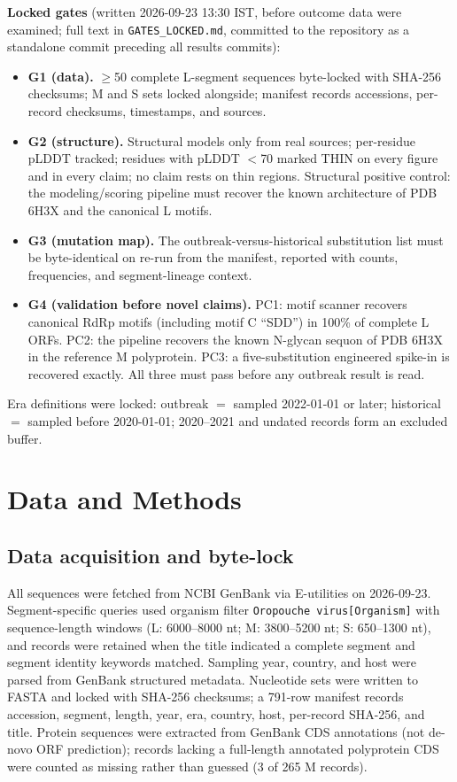 \documentclass[12pt]{article}
\begin{document}
\textbf{Locked gates} (written 2026-09-23 13:30 IST, before outcome data were examined; full text in \texttt{GATES\_LOCKED.md}, committed to the repository as a standalone commit preceding all results commits):
\begin{itemize}
\item \textbf{G1 (data).} $\geq$50 complete L-segment sequences byte-locked with SHA-256 checksums; M and S sets locked alongside; manifest records accessions, per-record checksums, timestamps, and sources.
\item \textbf{G2 (structure).} Structural models only from real sources; per-residue pLDDT tracked; residues with pLDDT $<$70 marked THIN on every figure and in every claim; no claim rests on thin regions. Structural positive control: the modeling/scoring pipeline must recover the known architecture of PDB 6H3X and the canonical L motifs.
\item \textbf{G3 (mutation map).} The outbreak-versus-historical substitution list must be byte-identical on re-run from the manifest, reported with counts, frequencies, and segment-lineage context.
\item \textbf{G4 (validation before novel claims).} PC1: motif scanner recovers canonical RdRp motifs (including motif C ``SDD'') in 100\% of complete L ORFs. PC2: the pipeline recovers the known N-glycan sequon of PDB 6H3X in the reference M polyprotein. PC3: a five-substitution engineered spike-in is recovered exactly. All three must pass before any outbreak result is read.
\end{itemize}
Era definitions were locked: outbreak $=$ sampled 2022-01-01 or later; historical $=$ sampled before 2020-01-01; 2020--2021 and undated records form an excluded buffer.

\section{Data and Methods}
\subsection{Data acquisition and byte-lock}
All sequences were fetched from NCBI GenBank via E-utilities on 2026-09-23. Segment-specific queries used organism filter \texttt{Oropouche virus[Organism]} with sequence-length windows (L: 6000--8000 nt; M: 3800--5200 nt; S: 650--1300 nt), and records were retained when the title indicated a complete segment and segment identity keywords matched. Sampling year, country, and host were parsed from GenBank structured metadata. Nucleotide sets were written to FASTA and locked with SHA-256 checksums; a 791-row manifest records accession, segment, length, year, era, country, host, per-record SHA-256, and title. Protein sequences were extracted from GenBank CDS annotations (not de-novo ORF prediction); records lacking a full-length annotated polyprotein CDS were counted as missing rather than guessed (3 of 265 M records).
\end{document}
